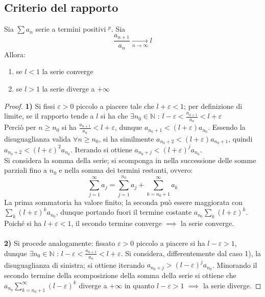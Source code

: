\documentclass[10pt, oneside]{book}
\theoremstyle{plain}
\begin{document}
\subsection{Criterio del rapporto}
\begin{ther}
Sia $\sum a_n$ serie a termini positivi \hyperlink{posit}{$^p$}. Sia
\[\frac{a_{n+1}}{a_n} \xrightarrow[n \rightarrow \infty]{} l\]
Allora:
\begin{enumerate}
    \item se $l < 1$ la serie converge
    \item se $l > 1$ la serie diverge a $+ \infty$
\end{enumerate}
\end{ther}
\begin{proof}
\textbf{1)} Si fissi $\varepsilon > 0$ piccolo a piacere tale che $l + \varepsilon < 1$; per definizione di limite, se il rapporto tende a $l$ si ha che $\exists n_0 \in \mathbb{N}$ : $l - \varepsilon < \frac{a_{n + 1}}{a_n} < l + \varepsilon$
\\Perciò per $n \geq n_0$ si ha $\frac{a_{n + 1}}{a_n} < l + \varepsilon$, dunque $a_{n_0 +1} < (l + \varepsilon) a_{n_0}$. Essendo la disuguaglianza valida $\forall n \geq n_0$, si ha similmente $a_{n_0 + 2} < (l + \varepsilon) a_{n_0 +1}$, quindi $a_{n_0 + 2} < (l + \varepsilon)^2 a_{n_0}$. Iterando si ottiene $a_{n_0 + j} < (l + \varepsilon)^j a_{n_0}$.
\\Si considera la somma della serie; si scomponga in nella successione delle somme parziali fino a $n_0$ e nella somma dei termini restanti, ovvero:
\[\sum \limits_{j=1}^{\infty} a_j = \sum \limits_{j=1}^{n_0} a_j + \sum \limits_{k=n_0 + 1}^{\infty} a_k\]
La prima sommatoria ha valore finito; la seconda può essere maggiorata con $\sum_k (l + \varepsilon)^k a_{n_0}$, dunque portando fuori il termine costante $a_{n_0} \sum_k (l + \varepsilon)^k$. Poiché si ha $l + \varepsilon < 1$, il secondo termine converge $\implies$ la serie converge.
\\~\\\textbf{2)} Si procede analogamente: fissato $\varepsilon > 0$ piccolo a piacere si ha $l - \varepsilon > 1$, dunque $\exists n_0 \in \mathbb{N}$ : $l - \varepsilon < \frac{a_{n + 1}}{a_n} < l + \varepsilon$. Si considera, differentemente dal caso 1), la disuguaglianza di sinistra; si ottiene iterando $a_{n_0 + j} > (l - \varepsilon)^j a_{n_0}$. Minorando il secondo termine della scomposizione della somma della serie si ottiene che $a_{n_0} \sum \limits_{k=n_0 + 1}^{\infty} (l - \varepsilon)^k$ diverge a $+ \infty$ in quanto $l - \varepsilon > 1$ $\implies$ la serie diverge.
\end{proof}
\end{document}
